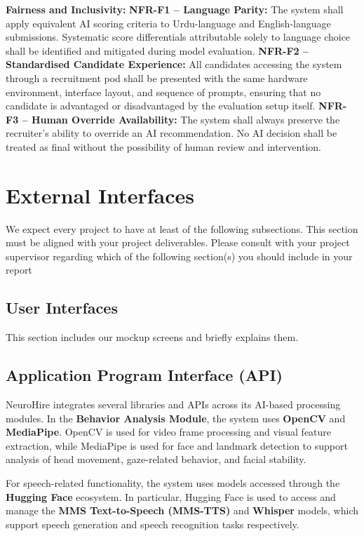 \begin{outline}
  \1 \textbf{Fairness and Inclusivity:}
  \2 \textbf{NFR-F1 -- Language Parity:} The system shall apply equivalent AI scoring criteria to Urdu-language and English-language submissions. Systematic score differentials attributable solely to language choice shall be identified and mitigated during model evaluation.
  \2 \textbf{NFR-F2 -- Standardised Candidate Experience:} All candidates accessing the system through a recruitment pod shall be presented with the same hardware environment, interface layout, and sequence of prompts, ensuring that no candidate is advantaged or disadvantaged by the evaluation setup itself.
  \2 \textbf{NFR-F3 -- Human Override Availability:} The system shall always preserve the recruiter's ability to override an AI recommendation. No AI decision shall be treated as final without the possibility of human review and intervention.
\end{outline}

\section{External Interfaces}

We expect every project to have at least of the following subsections. This section must be aligned with your project deliverables. Please consult with your project supervisor regarding which of the following section(s) you should include in your report

\subsection{User Interfaces}
This section includes our mockup screens and briefly explains them.

\subsection{Application Program Interface (API)}
NeuroHire integrates several libraries and APIs across its AI-based processing modules. In the \textbf{Behavior Analysis Module}, the system uses \textbf{OpenCV} and \textbf{MediaPipe}. OpenCV is used for video frame processing and visual feature extraction, while MediaPipe is used for face and landmark detection to support analysis of head movement, gaze-related behavior, and facial stability.

For speech-related functionality, the system uses models accessed through the \textbf{Hugging Face} ecosystem. In particular, Hugging Face is used to access and manage the \textbf{MMS Text-to-Speech (MMS-TTS)} and \textbf{Whisper} models, which support speech generation and speech recognition tasks respectively.

